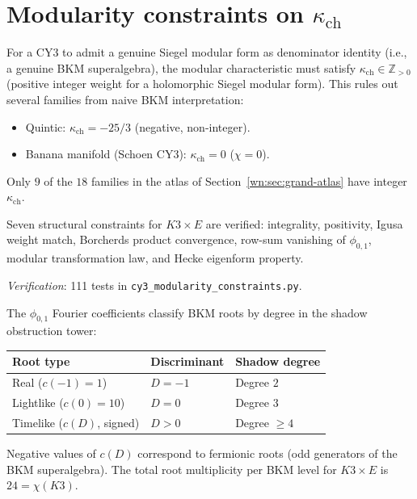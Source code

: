 \documentclass[11pt]{article}
\newcommand{\Z}{\mathbb{Z}}
\begin{document}
\section{Modularity constraints on $\kappa_{\mathrm{ch}}$}
\label{wn:sec:modularity-constraints}

\begin{proposition}
\label{prop:modularity-constraints}
For a CY3 to admit a genuine Siegel modular form as denominator identity (i.e., a genuine BKM superalgebra), the modular characteristic must satisfy $\kappa_{\mathrm{ch}} \in \Z_{> 0}$ (positive integer weight for a holomorphic Siegel modular form). This rules out several families from naive BKM interpretation:
\begin{itemize}
 \item Quintic: $\kappa_{\mathrm{ch}} = -25/3$ (negative, non-integer).
 \item Banana manifold (Schoen CY3): $\kappa_{\mathrm{ch}} = 0$ ($\chi = 0$).
\end{itemize}
Only $9$ of the $18$ families in the atlas of Section~\ref{wn:sec:grand-atlas} have integer $\kappa_{\mathrm{ch}}$.

Seven structural constraints for $K3 \times E$ are verified: integrality, positivity, Igusa weight match, Borcherds product convergence, row-sum vanishing of $\phi_{0,1}$, modular transformation law, and Hecke eigenform property.

\noindent\textit{Verification}: 111 tests in \texttt{cy3\_modularity\_constraints.py}.
\end{proposition}

\begin{remark}
\label{rem:phi01-degree-map}
The $\phi_{0,1}$ Fourier coefficients classify BKM roots by degree in the shadow obstruction tower:
\begin{center}
\renewcommand{\arraystretch}{1.2}
\begin{tabular}{lll}
 \toprule
 \textbf{Root type} & \textbf{Discriminant} & \textbf{Shadow degree} \\
 \midrule
 Real ($c(-1) = 1$) & $D = -1$ & Degree $2$ \\
 Lightlike ($c(0) = 10$) & $D = 0$ & Degree $3$ \\
 Timelike ($c(D)$, signed) & $D > 0$ & Degree $\geq 4$ \\
 \bottomrule
\end{tabular}
\end{center}
Negative values of $c(D)$ correspond to fermionic roots (odd generators of the BKM superalgebra). The total root multiplicity per BKM level for $K3 \times E$ is $24 = \chi(K3)$.
\end{remark}
\end{document}
